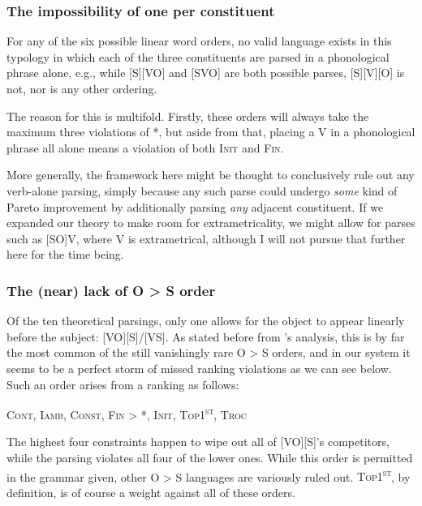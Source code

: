 \documentclass{article}
\newcommand{\cont}{\textsc{Cont}}
\newcommand{\iamb}{\textsc{Iamb}}
\newcommand{\cons}{\textsc{Const}}
\newcommand{\topf}{\textsc{Top1\textsuperscript{st}}}
\newcommand{\nophi}{\textsc{*\textphi}}
\newcommand{\finphi}{\textsc{Fin\textphi}}
\newcommand{\initphi}{\textsc{Init\textphi}}
\newcommand{\troc}{\textsc{Troc}}
\begin{document}
\subsubsection{The impossibility of one {\textphi} per constituent}

For any of the six possible linear word orders, no valid language exists in this typology in which each of the three constituents are parsed in a phonological phrase alone, e.g., while [S][VO] and [SVO] are both possible parses, [S][V][O] is not, nor is any other ordering.

The reason for this is multifold.
Firstly, these orders will always take the maximum three violations of {\nophi}, but aside from that, placing a V in a phonological phrase all alone means a violation of both {\initphi} and {\finphi}.

More generally, the framework here might be thought to conclusively rule out any verb-alone parsing, simply because any such parse could undergo \emph{some} kind of Pareto improvement by additionally parsing \emph{any} adjacent constituent.
If we expanded our theory to make room for extrametricality, we might allow for parses such as [SO]V, where V is extrametrical, although I will not pursue that further here for the time being.

\subsubsection{The (near) lack of O {\textgreater} S order}

Of the ten theoretical parsings, only one allows for the object to appear linearly before the subject: [VO][S]/[VS].
As stated before from \textcite{dryer13}'s analysis, this is by far the most common of the still vanishingly rare O {\textgreater} S orders, and in our system it seems to be a perfect storm of missed ranking violations as we can see below.
Such an order arises from a ranking as follows:


\begin{center}
\cont, \iamb, \cons, {\finphi} {\textgreater} \nophi, \initphi, \topf, \troc
\end{center}

The highest four constraints happen to wipe out all of [VO][S]'s competitors, while the parsing violates all four of the lower ones.
While this order is permitted in the grammar given, other O {\textgreater} S languages are variously ruled out.
{\topf}, by definition, is of course a weight against all of these orders.
\end{document}

